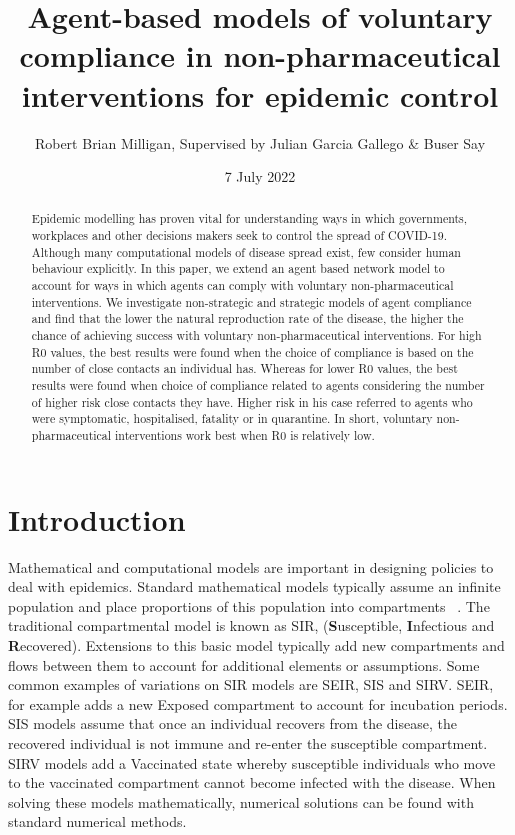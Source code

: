 \documentclass{article}
\title{Agent-based models of voluntary compliance in non-pharmaceutical interventions for epidemic control}
\author{Robert Brian Milligan, Supervised by Julian Garcia Gallego \& Buser Say}
\date{7 July 2022}
\begin{document}
\maketitle

\begin{abstract}
Epidemic modelling has proven vital for understanding ways in which governments, workplaces and other decisions makers seek to control the spread of COVID-19. Although many computational models of disease spread exist, few consider human behaviour explicitly. In this paper, we extend an agent based network model to account for ways in which agents can comply with voluntary non-pharmaceutical interventions. We investigate non-strategic and strategic models of agent compliance and find that the lower the natural reproduction rate of the disease, the higher the chance of achieving success with voluntary non-pharmaceutical interventions. For high R0 values, the best results were found when the choice of compliance is based on the number of close contacts an individual has. Whereas for lower R0 values, the best results were found when choice of compliance related to agents considering the number of higher risk close contacts they have. Higher risk in his case referred to agents who were symptomatic, hospitalised, fatality or in quarantine. In short, voluntary non-pharmaceutical interventions work best when R0 is relatively low.
\end{abstract}



\newpage 

\tableofcontents

\newpage 

\section{Introduction}

Mathematical and computational models are important in designing policies to deal with epidemics. 
Standard mathematical models typically assume an infinite population and place proportions of this population into compartments ~\cite{cooper_mondal_antonopoulos_2020}. 
The traditional compartmental model is known as SIR, ({\bf S}usceptible, {\bf I}nfectious and {\bf R}ecovered). 
Extensions to this basic model typically add new compartments and flows between them to account for additional elements or assumptions. 
Some common examples of variations on SIR models are SEIR, SIS and SIRV. 
SEIR, for example adds a new Exposed compartment to account for incubation periods. 
SIS models assume that once an individual recovers from the disease, the recovered individual is not immune and re-enter the susceptible compartment.
SIRV models add a Vaccinated state whereby susceptible individuals who move to the vaccinated compartment cannot become infected with the disease.
When solving these models mathematically, numerical solutions can be found with standard numerical methods. \newline
\end{document}
